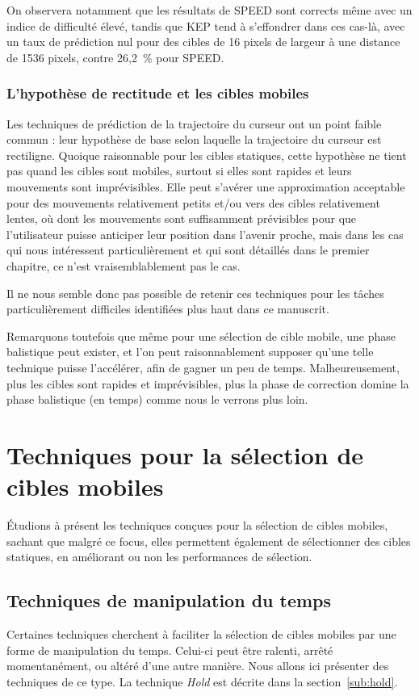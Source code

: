 	On observera notamment que les résultats de SPEED sont corrects même avec un indice de difficulté élevé, tandis que KEP tend à s'effondrer dans ces cas-là, avec un taux de prédiction nul pour des cibles de 16 pixels de largeur à une distance de 1536 pixels, contre 26,2~\%{} pour SPEED.
	
	\subsubsection{L'hypothèse de rectitude et les cibles mobiles}
	Les techniques de prédiction de la trajectoire du curseur ont un point faible commun : leur hypothèse de base selon laquelle la trajectoire du curseur est rectiligne. Quoique raisonnable pour les cibles statiques, cette hypothèse ne tient pas quand les cibles sont mobiles, surtout si elles sont rapides et leurs mouvements sont imprévisibles. Elle peut s'avérer une approximation acceptable pour des mouvements relativement petits et/ou vers des cibles relativement lentes, où dont les mouvements sont suffisamment prévisibles pour que l'utilisateur puisse anticiper leur position dans l'avenir proche, mais dans les cas qui nous intéressent particulièrement et qui sont détaillés dans le premier chapitre, ce n'est vraisemblablement pas le cas.
	
	Il ne nous semble donc pas possible de retenir ces techniques pour les tâches particulièrement difficiles identifiées plus haut dans ce manuscrit.
	
	Remarquons toutefois que même pour une sélection de cible mobile, une phase balistique peut exister, et l'on peut raisonnablement supposer qu'une telle technique puisse l'accélérer, afin de gagner un peu de temps. Malheureusement, plus les cibles sont rapides et imprévisibles, plus la phase de correction domine la phase balistique (en temps) comme nous le verrons plus loin.

\section{Techniques pour la sélection de cibles mobiles}
	Étudions à présent les techniques conçues pour la sélection de cibles mobiles, sachant que malgré ce focus, elles permettent également de sélectionner des cibles statiques, en améliorant ou non les performances de sélection.
	
	\subsection{Techniques de manipulation du temps}
	\label{sub:timeLord}
	Certaines techniques cherchent à faciliter la sélection de cibles mobiles par une forme de manipulation du temps. Celui-ci peut être ralenti, arrêté momentanément, ou altéré d'une autre manière. Nous allons ici présenter des techniques de ce type.	La technique \emph{Hold} est décrite dans la section~\ref{sub:hold}.
	
